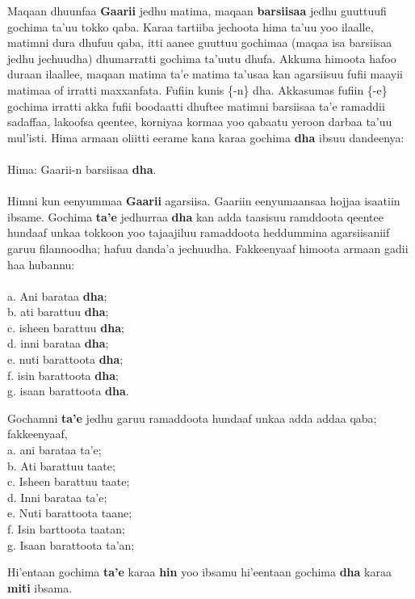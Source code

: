\documentclass[11pt,b5paper]{book}
\begin{document}
Maqaan dhuunfaa \textbf{Gaarii} jedhu matima, maqaan \textbf{barsiisaa} jedhu guuttuufi gochima ta’uu tokko qaba. Karaa tartiiba jechoota hima ta’uu yoo ilaalle, matimni dura dhufuu qaba, itti
aanee guuttuu gochimaa (maqaa isa barsiisaa jedhu jechuudha) dhumarratti gochima ta’uutu dhufa. Akkuma himoota hafoo duraan ilaallee, maqaan matima ta’e matima ta’usaa kan agarsiisuu fufii maayii matimaa of irratti maxxanfata. Fufiin kunis \{-n\} dha. Akkasumas fufiin \{-e\} gochima irratti akka fufii
boodaatti dhuftee matimni barsiisaa ta’e ramaddii sadaffaa, lakoofsa qeentee, korniyaa kormaa yoo qabaatu yeroon darbaa ta’uu mul’isti. Hima armaan oliitti eerame kana karaa gochima
\textbf{dha} ibsuu dandeenya: \\
\\
Hima: Gaarii-n barsiisaa \textbf{dha}.\\
\\

Himni kun eenyummaa \textbf{Gaarii} agarsiisa. Gaariin eenyumaansaa hojjaa isaatiin ibsame. Gochima \textbf{ta’e} jedhurraa \textbf{dha} kan adda taasisuu ramddoota qeentee hundaaf unkaa tokkoon yoo
tajaajiluu ramaddoota heddummina agarsiisaniif garuu filannoodha; hafuu danda’a jechuudha. Fakkeenyaaf himoota armaan gadii haa hubannu: \\
\\
a. Ani barataa \textbf{dha}; \\
b. ati barattuu \textbf{dha}; \\
c. isheen barattuu \textbf{dha}; \\
d. inni barataa \textbf{dha}; \\
e. nuti barattoota \textbf{dha}; \\
f. isin barattoota \textbf{dha}; \\
g. isaan barattoota \textbf{dha}.

Gochamni \textbf{ta’e} jedhu garuu ramaddoota hundaaf unkaa adda
addaa qaba; fakkeenyaaf,\\
a. ani barataa ta'e;\\
b. Ati barattuu taate;\\
c. Isheen barattuu taate;\\
d. Inni barataa ta'e;\\
e. Nuti barattoota taane;\\
f. Isin barttoota taatan;\\
g. Isaan barattoota ta'an;

 
Hi'entaan gochima \textbf{ta’e} karaa \textbf{hin} yoo ibsamu hi'eentaan gochima \textbf{dha} karaa \textbf{miti} ibsama. 
\end{document}
